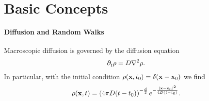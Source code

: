 \section{Basic Concepts}

\paragraph{Diffusion and Random Walks}
Macroscopic diffusion is governed by the diffusion equation
\begin{align*}
	\del{}{t}\rho = D\laplacian{\rho}.
\end{align*}
In particular, with the initial condition $\rho(\vb{x}, t_{0}) = \delta(\vb{x} - \vb{x}_{0})$ we find
\begin{align*}
	\rho(\vb{x}, t) = \left(4\pi D(t - t_{0})\right)^{-\frac{d}{2}}e^{-\frac{\abs{\vb{x} - \vb{x}_{0}}^{2}}{4D(t - t_{0})}}.
\end{align*}

